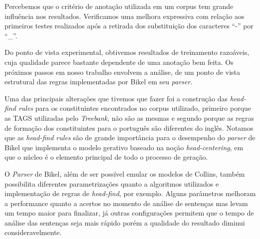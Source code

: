 Percebemos que o critério de anotação utilizada em um corpus tem grande influência nos resultados. Verificamos uma melhora expressiva com relação aos primeiros testes realizados após a retirada dos substituição dos caracteres ``{-}'' por ``\_''.

Do ponto de vista experimental, obtivemos resultados de treinamento razoáveis, cuja qualidade parece bastante dependente de uma anotação bem feita. Os próximos passos em nosso trabalho envolvem a análise, de um ponto de vista estrutural das regras implementadas por Bikel em seu \emph{parser}.

Uma das principais alterações que tivemos que fazer foi a construção das \emph{head-find rules} para os constituintes encontrados no corpus utilizado, primeiro porque as TAGS utilizadas pelo \emph{Treebank}, não são as mesmas e segundo porque as regras de formação dos constituintes para o português são diferentes do inglês. Notamos que as \emph{head-find rules} são de grande importância para o desempenho do \emph{parser} de Bikel que implementa o modelo gerativo baseado na noção \emph{head-centering}, em que o núcleo é o elemento principal de todo o processo de geração.

O \emph{Parser} de Bikel, além de ser possível emular os modelos de Collins, também possibilita diferentes parametrizações quanto a algoritmos utilizados e implementação de regras de \emph{head-find}, por exemplo. Alguns parâmetros melhoram a performance quanto a acertos no momento de análise de sentenças mas levam um tempo maior para finalizar, já outras configurações permitem que o tempo de análise das sentenças seja mais rápido porém a qualidade do resultado diminui consideravelmente.
